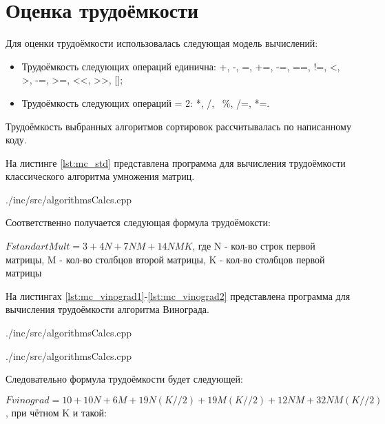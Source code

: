 \newpage
\section{Оценка трудоёмкости}
Для оценки трудоёмкости использовалась следующая модель вычислений: \cite{calc_model}
\begin{itemize}
	\item Трудоёмкость следующих операций единична: +, -, =, +=, -=, ==, !=, <, >, -=, >=, <<, >>, [];
	\item Трудоёмкость следующих операций = 2: *, /, \, \%, /=, *=.
\end{itemize}

Трудоёмкость выбранных алгоритмов сортировок рассчитывалась по написанному коду.

На листинге \ref{lst:mc_std} представлена программа для вычисления трудоёмкости классического алгоритма умножения матриц.

\newpage
\begin{lstinputlisting}[
	caption={Вычисление трудоёмкости классического алгоритма умножения матриц},
	label={lst:mc_std},
	style={c},
	linerange={1-27},
	]{./inc/src/algorithmsCalcs.cpp}
\end{lstinputlisting}

Соответственно получается следующая формула трудоёмоксти:

$FstandartMult = 3+4N+7NM+14NMK$, где N - кол-во строк первой матрицы, M - кол-во столбцов второй матрицы, K - кол-во столбцов первой матрицы

На листингах \ref{lst:mc_vinograd1}-\ref{lst:mc_vinograd2} представлена программа для вычисления трудоёмкости алгоритма Винограда.

\newpage
\begin{lstinputlisting}[
	caption={Вычисление трудоёмкости алгоритма Винограда, часть 1},
	label={lst:mc_vinograd1},
	style={c},
	linerange={29-61},
	]{./inc/src/algorithmsCalcs.cpp}
\end{lstinputlisting}

\newpage
\begin{lstinputlisting}[
	caption={Вычисление трудоёмкости алгоритма Винограда, часть 2},
	label={lst:mc_vinograd1},
	style={c},
	linerange={63-100},
	]{./inc/src/algorithmsCalcs.cpp}
\end{lstinputlisting}

Следовательно формула трудоёмкости будет следующей:

$Fvinograd = 10+10N+6M+19N(K//2)+19M(K//2)+12NM+32NM(K//2)$,  при чётном K
и такой:

